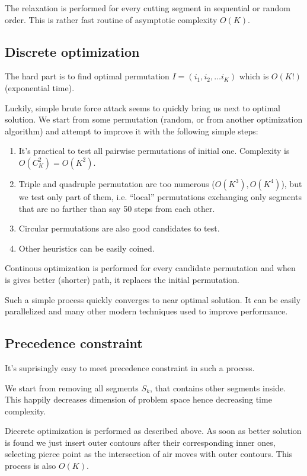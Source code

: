 \documentclass{../download/tPRS2e}
\begin{document}
The relaxation is performed for every cutting segment
in sequential or random order.
This is rather fast routine
of asymptotic complexity
$O(K)$.

\subsection{Discrete optimization}

The hard part is to find optimal permutation
$I = (i_1, i_2, \dots i_K)$
which is $O(K!)$
(exponential time).

Luckily,
simple brute force attack seems
to quickly bring us next to optimal solution.
We start from some permutation
(random, or from another optimization algorithm)
and attempt to improve it with the following simple steps:

\begin{enumerate}
    \item{}
    It's practical to test all pairwise permutations of initial one.
    Complexity is $O(C_K^2) = O(K^2)$.
    \item{}
    Triple and quadruple permutation are too numerous
    ($O(K^3), O(K^4)$),
    but we test only part of them,
    i.e. ``local'' permutations
    exchanging only segments that are no farther
    than say 50 steps from each other.
    \item{}
    Circular permutations are also good candidates to test.
    \item{}
    Other heuristics can be easily coined.
\end{enumerate}

Continous optimization is performed for every candidate permutation
and when is gives better
(shorter) path,
it replaces the initial permutation.

Such a simple process quickly converges to near optimal solution.
It can be easily parallelized and many other
modern techniques used to improve performance.

\subsection{Precedence constraint}

It's suprisingly easy to meet precedence constraint in such a process.

We start from removing all segments $S_k$,
that contains other segments inside.
This happily decreases dimension of problem space
hence decreasing time complexity.

Diecrete optimization is performed as described above.
As soon as better solution is found we just
insert outer contours after their corresponding inner ones,
selecting pierce point as the intersection of air moves with
outer contours.
This process is also $O(K)$.
\end{document}
